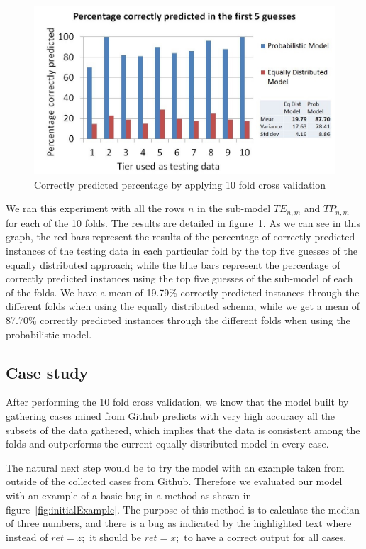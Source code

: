 \documentclass[conference]{IEEEtran}
\begin{document}
\begin{figure}[!h]
  \centering
    \includegraphics[scale=0.33]{sanity1}
  \caption{Correctly predicted percentage by applying 10 fold cross validation}
  \label{fig:results10fcv}
\end{figure}

We ran this experiment with all the rows $n$ in the sub-model $TE_{n,m}$ and 
$TP_{n,m}$ for each of the 10 
folds. The results are detailed in figure~\ref{fig:results10fcv}. As we can see 
in this graph, the red bars represent the results of the percentage of correctly 
predicted instances of the testing data in each particular fold by the top five guesses of the equally distributed approach; while the blue 
bars represent the percentage of correctly predicted instances using the top five 
guesses of the sub-model of each of the folds. We have a mean of 19.79\% 
correctly predicted instances through the different folds when using the equally 
distributed schema, while we get a mean of 87.70\% correctly predicted instances 
through the different folds when using the probabilistic model. 

\subsection{Case study}
\label{sec:casestudy}

After performing the 10 fold cross validation, we know that the model built by 
gathering cases mined from Github predicts with very high accuracy all the 
subsets of the data gathered, which implies that the data is consistent among 
the folds and outperforms the current equally distributed model in every case. 

The natural next step would be to try the model with an example taken from 
outside of the collected cases from Github. Therefore we evaluated our model 
with an example of a basic bug in a method as shown in figure~\ref{fig:initialExample}. The purpose of this method is to calculate the median 
of three numbers, and there is a bug as indicated by the highlighted text where 
instead of $ret = z;$ it should be $ret = x;$ to have a correct output 
for all cases.
\end{document}
